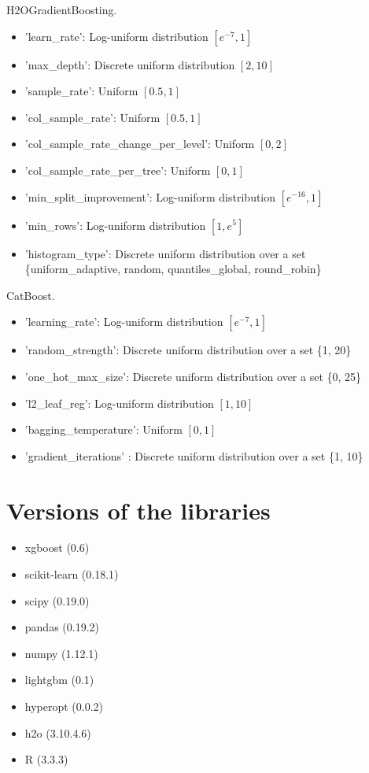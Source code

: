\documentclass{article}
\begin{document}
\medskip
\noindent H2OGradientBoosting.
\medskip 
\begin{itemize}
  \item 'learn\_rate': Log-uniform distribution $[e^{-7}, 1]$
  \item 'max\_depth': Discrete uniform distribution $[2, 10]$
  \item 'sample\_rate': Uniform $[0.5, 1]$
  \item 'col\_sample\_rate': Uniform $[0.5, 1]$
  \item 'col\_sample\_rate\_change\_per\_level': Uniform $[0, 2]$
  \item 'col\_sample\_rate\_per\_tree': Uniform $[0, 1]$
  \item 'min\_split\_improvement': Log-uniform distribution $[e^{-16}, 1]$
  \item 'min\_rows': Log-uniform distribution $[1, e^{5}]$
  \item 'histogram\_type': Discrete uniform distribution over a set \{uniform\_adaptive, random, quantiles\_global, round\_robin\}
\end{itemize}

\medskip
\noindent CatBoost.
\begin{itemize}
  \item 'learning\_rate':  Log-uniform distribution $[e^{-7}, 1]$
  \item 'random\_strength': Discrete uniform distribution over a set  \{1, 20\}
  \item 'one\_hot\_max\_size': Discrete uniform distribution over a set  \{0, 25\}
  \item 'l2\_leaf\_reg': Log-uniform distribution $[1, 10]$
  \item 'bagging\_temperature': Uniform $[0, 1]$
  \item 'gradient\_iterations' : Discrete uniform distribution over a set  \{1, 10\}
\end{itemize}


\section{Versions of the libraries}

\begin{itemize}
  \item xgboost (0.6)
  \item scikit-learn (0.18.1)
  \item scipy (0.19.0)
  \item pandas (0.19.2)
  \item numpy (1.12.1)
  \item lightgbm (0.1)
  \item hyperopt (0.0.2)
  \item h2o (3.10.4.6)
  \item R (3.3.3)
\end{itemize}
\end{document}
